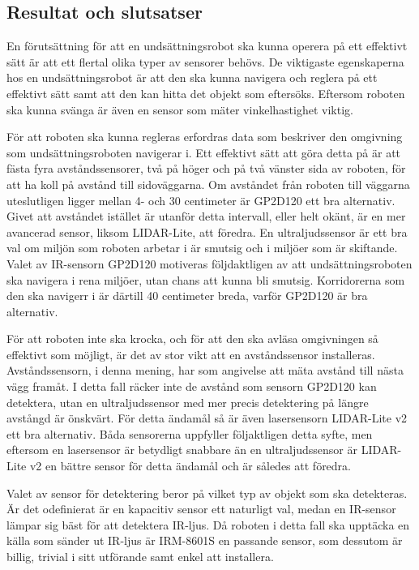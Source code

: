 \documentclass[11pt]{article}
\begin{document}
\begin{flushleft}
\pagebreak
\section{Resultat och slutsatser}
En förutsättning för att en undsättningsrobot ska kunna operera på ett effektivt sätt är att ett flertal olika typer av sensorer behövs. De viktigaste egenskaperna hos en undsättningsrobot är att den ska kunna navigera och reglera på ett effektivt sätt samt att den kan hitta det objekt som eftersöks. Eftersom roboten ska kunna svänga är även en sensor som mäter vinkelhastighet viktig.

För att roboten ska kunna regleras erfordras data som beskriver den omgivning som undsättningsroboten navigerar i. Ett effektivt sätt att göra detta på är att fästa fyra avståndssensorer, två på höger och på två vänster sida av roboten, för att ha koll på avstånd till sidoväggarna. Om avståndet från roboten till väggarna uteslutligen ligger mellan 4- och 30 centimeter är GP2D120 ett bra alternativ. Givet att avståndet istället är utanför detta intervall, eller helt okänt, är en mer avancerad sensor, liksom LIDAR-Lite, att föredra. En ultraljudssensor är ett bra val om miljön som roboten arbetar i är smutsig och i miljöer som är skiftande. Valet av IR-sensorn GP2D120 motiveras följdaktligen av att undsättningsroboten ska navigera i rena miljöer, utan chans att kunna bli smutsig. Korridorerna som den ska navigerr i är därtill 40 centimeter breda, varför GP2D120 är bra alternativ. 

För att roboten inte ska krocka, och för att den ska avläsa omgivningen så effektivt som möjligt, är det av stor vikt att en avståndssensor installeras. Avståndssensorn, i denna mening, har som angivelse att mäta avstånd till nästa vägg framåt. I detta fall räcker inte de avstånd som sensorn GP2D120 kan detektera, utan en ultraljudssensor med mer precis detektering på längre avstångd är önskvärt. För detta ändamål så är även lasersensorn LIDAR-Lite v2 ett bra alternativ. Båda sensorerna uppfyller följaktligen detta syfte, men eftersom en lasersensor är betydligt snabbare än en ultraljudssensor är LIDAR-Lite v2 en bättre sensor för detta ändamål och är således att föredra. 

Valet av sensor för detektering beror på vilket typ av objekt som ska detekteras. Är det odefinierat är en kapacitiv sensor ett naturligt val, medan en IR-sensor lämpar sig bäst för att detektera IR-ljus. Då roboten i detta fall ska upptäcka en källa som sänder ut IR-ljus är IRM-8601S en passande sensor, som dessutom är billig, trivial i sitt utförande samt enkel att installera.


\end{flushleft}
\end{document}
